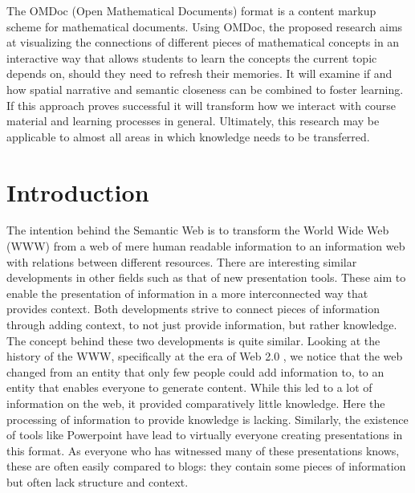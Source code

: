 \documentclass[twoside, 12pt]{article}
\begin{document}
The OMDoc (Open Mathematical Documents) format \cite{Kohlhase:OMDoc1.2} is a content markup scheme for mathematical documents. Using OMDoc, the proposed research aims at visualizing the connections of different pieces of mathematical concepts in an interactive way that allows students to learn the concepts the current topic depends on, should they need to refresh their memories. It will examine if and how spatial narrative and semantic closeness can be combined to foster learning. If this approach proves successful it will transform how we interact with course material and learning processes in general. Ultimately, this research may be applicable to almost all areas in which knowledge needs to be transferred.\\ 

  \newpage
  \tableofcontents

  \clearpage

  \section{Introduction}
  \label{sec:introduction}

The intention behind the Semantic Web \cite{BernersLee:tsw98} is to transform the World Wide Web (WWW) from a web of mere human readable information to an information web with relations between different resources. There are interesting similar developments in other fields such as that of new presentation tools. These aim to enable the presentation of information in a more interconnected way that provides context. Both developments strive to connect pieces of information through adding context, to not just provide information, but rather knowledge.\\

The concept behind these two developments is quite similar. Looking at the history of the WWW, specifically at the era of Web 2.0 \cite{Weller:npentrel14}, we notice that the web changed from an entity that only few people could add information to, to an entity that enables everyone to generate content. While this led to a lot of information on the web, it provided comparatively little knowledge. Here the processing of information to provide knowledge is lacking. Similarly, the existence of tools like Powerpoint have lead to virtually everyone creating presentations in this format. As everyone who has witnessed many of these presentations knows, these are often easily compared to blogs: they contain some pieces of information but often lack structure and context.\\
\end{document}
